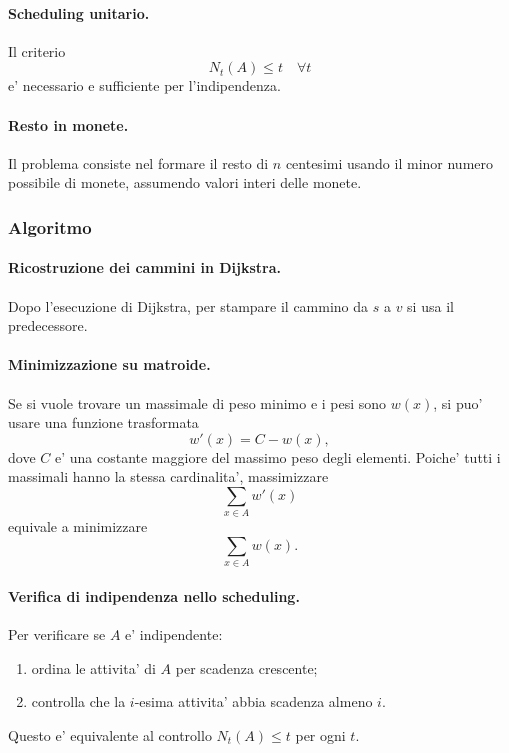 \paragraph{Scheduling unitario.}
Il criterio
\[
N_t(A)\le t\quad\forall t
\]
e' necessario e sufficiente per l'indipendenza.

\paragraph{Resto in monete.}
Il problema consiste nel formare il resto di $n$ centesimi usando il minor numero possibile di monete, assumendo valori interi delle monete.

\subsubsection{Algoritmo}
\paragraph{Ricostruzione dei cammini in Dijkstra.}
Dopo l'esecuzione di Dijkstra, per stampare il cammino da $s$ a $v$ si usa il predecessore.

\begin{algorithm}[H]
	\caption{\textsc{PrintPath}$(s,v)$}
\end{algorithm}

\paragraph{Minimizzazione su matroide.}
Se si vuole trovare un massimale di peso minimo e i pesi sono $w(x)$, si puo' usare una funzione trasformata
\[
w'(x)=C-w(x),
\]
dove $C$ e' una costante maggiore del massimo peso degli elementi. Poiche' tutti i massimali hanno la stessa cardinalita', massimizzare
\[
\sum_{x\in A} w'(x)
\]
equivale a minimizzare
\[
\sum_{x\in A} w(x).
\]

\paragraph{Verifica di indipendenza nello scheduling.}
Per verificare se $A$ e' indipendente:
\begin{enumerate}
	\item ordina le attivita' di $A$ per scadenza crescente;
	\item controlla che la $i$-esima attivita' abbia scadenza almeno $i$.
\end{enumerate}
Questo e' equivalente al controllo $N_t(A)\le t$ per ogni $t$.

